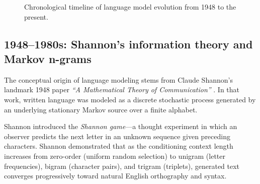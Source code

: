 \documentclass[../../main.tex]{subfiles}
\begin{document}
\begin{figure}[htbp]
\caption{Chronological timeline of language model evolution from 1948 to the present.}
\label{fig:history_timeline}
\end{figure}

\subsection{1948--1980s: Shannon's information theory and Markov n-grams}
\label{subsec:milestone_shannon_markov}

The conceptual origin of language modeling stems from Claude Shannon's landmark 1948 paper \textit{``A Mathematical Theory of Communication''} \cite{shannon1948}. In that work, written language was modeled as a discrete stochastic process generated by an underlying stationary Markov source over a finite alphabet. 

Shannon introduced the \emph{Shannon game}—a thought experiment in which an observer predicts the next letter in an unknown sequence given preceding characters. Shannon demonstrated that as the conditioning context length increases from zero-order (uniform random selection) to unigram (letter frequencies), bigram (character pairs), and trigram (triplets), generated text converges progressively toward natural English orthography and syntax.
\end{document}
